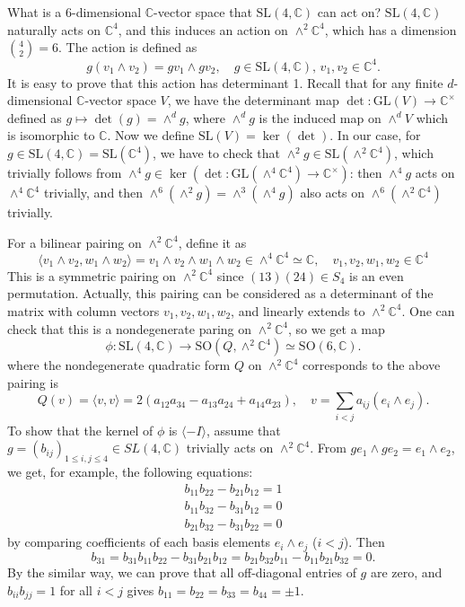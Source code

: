 \documentclass{article}
\newcommand{\SO}{\mathrm{SO}}
\newcommand{\SL}{\mathrm{SL}}
\newcommand{\GL}{\mathrm{GL}}
\begin{document}
What is a 6-dimensional $\mathbb{C}$-vector space that $\SL(4, \mathbb{C})$ can act on?  $\SL(4, \mathbb{C})$ naturally acts on $\mathbb{C}^{4}$, and this induces an action on $\wedge^{2}\mathbb{C}^{4}$, which has a dimension $\binom{4}{2}= 6$. The action is defined as
$$
g(v_{1}\wedge v_{2}) = gv_{1}\wedge gv_{2},\quad g\in \SL(4, \mathbb{C}), \,v_{1}, v_{2}\in \mathbb{C}^{4}. 
$$
It is easy to prove that this action has determinant 1. Recall that for any finite $d$-dimensional $\mathbb{C}$-vector space $V$, we have the determinant map $\det:\GL(V)\to \mathbb{C}^{\times}$ defined as $g\mapsto \det(g) = \wedge^{d}g$, where $\wedge^{d}g$ is the induced map on $\wedge^{d}V$ which is isomorphic to $\mathbb{C}$. 
Now we define $\SL(V) = \ker(\det)$. 
In our case, for $g\in \SL(4, \mathbb{C}) = \SL(\mathbb{C}^{4})$, we have to check that $\wedge^{2}g\in \SL(\wedge^{2}\mathbb{C}^{4})$, which trivially follows from $\wedge^{4}g \in \ker(\det:\GL(\wedge^{4}\mathbb{C}^{4})\to \mathbb{C}^{\times})$: then $\wedge^{4}g$ acts on $\wedge^{4}\mathbb{C}^{4}$ trivially, and then $\wedge^{6}(\wedge^{2}g) = \wedge^{3}(\wedge^{4}g)$ also acts on $\wedge^{6}(\wedge^{2}\mathbb{C}^{4})$ trivially.  

For a bilinear pairing on $\wedge^{2}\mathbb{C}^{4}$, define it as 
$$
\langle v_{1}\wedge v_{2}, w_{1}\wedge w_{2}\rangle = v_{1}\wedge v_{2}\wedge w_{1}\wedge w_{2}\in \wedge^{4}\mathbb{C}^{4}\simeq \mathbb{C}, \quad v_{1}, v_{2}, w_{1}, w_{2}\in \mathbb{C}^{4}
$$
This is a symmetric pairing on $\wedge^{2}\mathbb{C}^{4}$ since $(13)(24)\in S_{4}$ is an even permutation. Actually, this pairing can be considered as a determinant of the matrix with column vectors $v_{1}, v_{2}, w_{1}, w_{2}$, and linearly extends to $\wedge^{2}\mathbb{C}^{4}$. 
One can check that this is a nondegenerate paring on $\wedge^{2}\mathbb{C}^{4}$, so we get a map 
$$
\phi:\SL(4, \mathbb{C})\to \SO(Q, \wedge^{2}\mathbb{C}^{4}) \simeq \SO(6, \mathbb{C}). 
$$
where the nondegenerate quadratic form $Q$ on $\wedge^{2}\mathbb{C}^{4}$ corresponds to the above pairing is 
$$
Q(v) = \langle v, v\rangle = 2(a_{12}a_{34}-a_{13}a_{24}+a_{14}a_{23}), \quad v = \sum_{i<j}a_{ij}(e_{i}\wedge e_{j}). 
$$
To show that the kernel of $\phi$ is $\langle -I\rangle$, assume that $g = (b_{ij})_{1\leq i, j\leq 4}\in SL(4, \mathbb{C})$ trivially acts on $\wedge^{2}\mathbb{C}^{4}$. From $ge_{1}\wedge ge_{2} = e_{1}\wedge e_{2}$, we get, for example, the following equations:
\begin{align*}
b_{11}b_{22}-b_{21}b_{12} = 1 \\
b_{11}b_{32} - b_{31}b_{12} = 0 \\
b_{21}b_{32}-b_{31}b_{22} = 0
\end{align*}
by comparing coefficients of each basis elements $e_{i}\wedge e_{j}$ ($i<j$). Then 
$$
b_{31} = b_{31}b_{11}b_{22} - b_{31}b_{21}b_{12} = b_{21}b_{32}b_{11} - b_{11}b_{21}b_{32} = 0.
$$
By the similar way, we can prove that all off-diagonal entries of $g$ are zero, and $b_{ii}b_{jj}  = 1$ for all $i<j$ gives $b_{11} = b_{22} = b_{33} = b_{44} = \pm 1$. 
\end{document}
